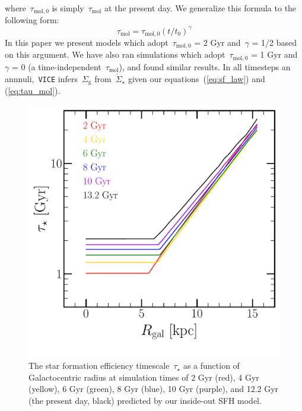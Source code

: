 \documentclass[fleqn, usenatbib]{mnras}
\newcommand{\refp}[1]{(\ref{#1})}
\begin{document}
where~$\tau_{\text{mol},0}$ is simply~$\tau_\text{mol}$ at the present day. We 
generalize this formula to the following form: 
\begin{equation} 
\tau_\text{mol} = \tau_{\text{mol},0}(t/t_0)^\gamma 
\label{eq:tau_mol}
\end{equation} 
In this paper we present models which adopt~$\tau_{\text{mol},0}$ = 2 Gyr 
\citep{Leroy2008, Leroy2013, Tacconi2018} and~$\gamma$ = 1/2 based on this 
argument. We have also ran simulations which adopt~$\tau_{\text{mol},0}$ = 1 
Gyr and~$\gamma$ = 0 (a time-independent~$\tau_\text{mol}$), and found similar
results. In all timesteps an annnuli,~\texttt{VICE} infers~$\Sigma_\text{g}$ 
from~$\dot{\Sigma}_\star$ given our equations~\refp{eq:sf_law} and 
\refp{eq:tau_mol}. 

\begin{figure} 
\centering 
\includegraphics[scale = 0.45]{sfe.pdf} 
\caption{The star formation efficiency timescale~$\tau_\star$ as a function of 
Galactocentric radius at simulation times of 2 Gyr (red), 4 Gyr (yellow), 
6 Gyr (green), 8 Gyr (blue), 10 Gyr (purple), and 12.2 Gyr (the present day, 
black) predicted by our inside-out SFH model. } 
\label{fig:sfe} 
\end{figure} 
\end{document}
